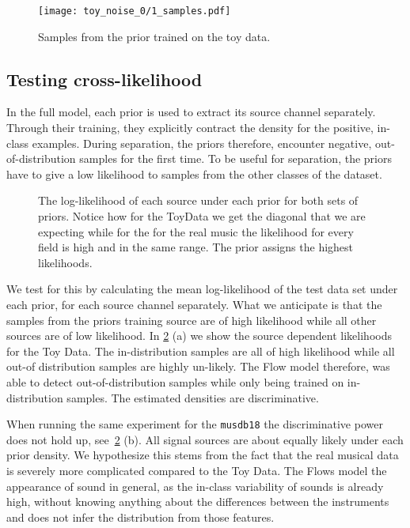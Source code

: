 \begin{figure}
    \texttt{[image: toy\_noise\_0/1\_samples.pdf]}%
    \label{fig:toy_time_sample}%
    \caption{Samples from the prior trained on the toy data.}
\end{figure}

\subsection{Testing cross-likelihood}
In the full model, each prior is used to extract its source channel separately. Through their training, they explicitly contract the density for the positive, in-class examples. During separation, the priors therefore, encounter negative, out-of-distribution samples for the first time. To be useful for separation, the priors have to give a low likelihood to samples from the other classes of the dataset.

\begin{figure}
    \centering
    \caption{The log-likelihood of each source under each prior for both sets of priors. Notice how for the ToyData we get the diagonal that we are expecting while for the for the real music the likelihood for every field is high and in the same range. The  prior assigns the highest likelihoods.}%
    \label{fig:noiseless_channels}%
\end{figure}

We test for this by calculating the mean log-likelihood of the test data set under each prior, for each source channel separately. What we anticipate is that the samples from the priors training source are of high likelihood while all other sources are of low likelihood. In \cref{fig:noiseless_channels} (a) we show the source dependent likelihoods for the Toy Data. The in-distribution samples are all of high likelihood while all out-of distribution samples are highly un-likely. The Flow model therefore, was able to detect out-of-distribution samples while only being trained on in-distribution samples. The estimated densities are discriminative.

When running the same experiment for the \texttt{musdb18} the discriminative power does not hold up, see~\cref{fig:noiseless_channels} (b). All signal sources are about equally likely under each prior density. We hypothesize this stems from the fact that the real musical data is severely more complicated compared to the Toy Data. The Flows model the appearance of sound in general, as the in-class variability of sounds is already high, without knowing anything about the  differences between the instruments and does not infer the distribution from those features.

